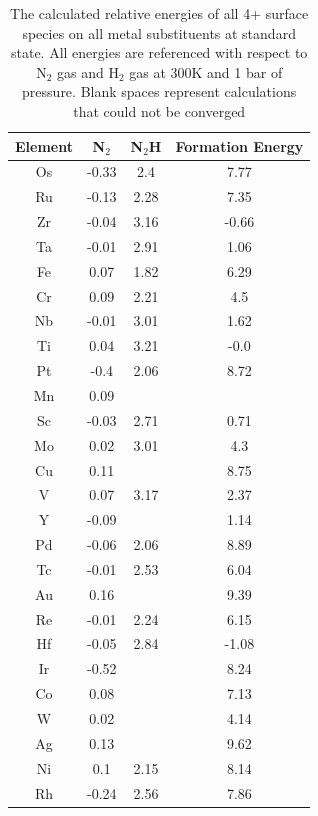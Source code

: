 \documentclass{article}
\begin{document}
\begin{table}
\begin{center}
\begin{tabular}{| c | c | c | c |}
\hline
Element & N$_2$ & N$_2$H & Formation Energy \\
\hline
Os & -0.33 & 2.4 & 7.77 \\
Ru & -0.13 & 2.28 & 7.35 \\
Zr & -0.04 & 3.16 & -0.66 \\
Ta & -0.01 & 2.91 & 1.06 \\
Fe & 0.07 & 1.82 & 6.29 \\
Cr & 0.09 & 2.21 & 4.5 \\
Nb & -0.01 & 3.01 & 1.62 \\
Ti & 0.04 & 3.21 & -0.0 \\
Pt & -0.4 & 2.06 & 8.72 \\
Mn & 0.09 &  &  \\
Sc & -0.03 & 2.71 & 0.71 \\
Mo & 0.02 & 3.01 & 4.3 \\
Cu & 0.11 &  & 8.75 \\
V & 0.07 & 3.17 & 2.37 \\
Y & -0.09 &  & 1.14 \\
Pd & -0.06 & 2.06 & 8.89 \\
Tc & -0.01 & 2.53 & 6.04 \\
Au & 0.16 &  & 9.39 \\
Re & -0.01 & 2.24 & 6.15 \\
Hf & -0.05 & 2.84 & -1.08 \\
Ir & -0.52 &  & 8.24 \\
Co & 0.08 &  & 7.13 \\
W & 0.02 &  & 4.14 \\
Ag & 0.13 &  & 9.62 \\
Ni & 0.1 & 2.15 & 8.14 \\
Rh & -0.24 & 2.56 & 7.86 \\
\hline
\end{tabular}
\end{center}
\label{table:4+_energies}
\caption{The calculated relative energies of all 4+ surface species on all metal substituents at standard state. All energies are referenced with respect to N$_2$ gas and H$_2$ gas at 300K and 1 bar of pressure. Blank spaces represent calculations that could not be converged}
\end{table}
\end{document}
